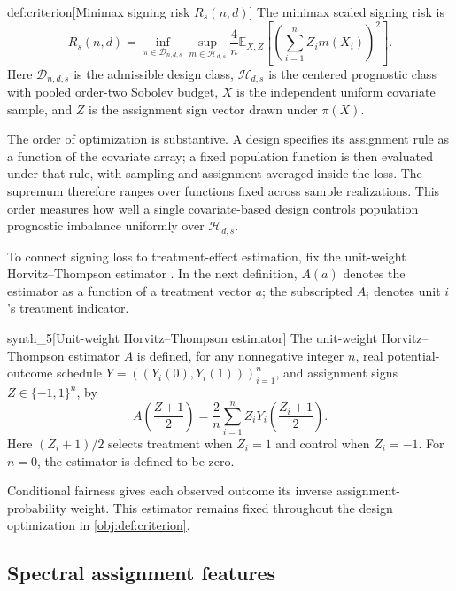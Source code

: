 \documentclass[11pt]{article}
\begin{document}
\begin{definitionv}{def:criterion}[Minimax signing risk $R_s(n,d)$]
The minimax scaled signing risk is
\[
R_s(n,d)
=
\inf_{\pi\in\mathcal D_{n,d,s}}
\sup_{m\in\mathcal H_{d,s}}
\frac{4}{n}
\mathbb E_{X,Z}
\left[
\left(\sum_{i=1}^{n}Z_i m(X_i)\right)^2
\right].
\]
Here \(\mathcal D_{n,d,s}\) is the admissible design class, \(\mathcal H_{d,s}\) is the centered prognostic class with pooled order-two Sobolev budget, \(X\) is the independent uniform covariate sample, and \(Z\) is the assignment sign vector drawn under \(\pi(X)\).
\end{definitionv}

The order of optimization is substantive. A design specifies its assignment rule as a function of the covariate array; a fixed population function is then evaluated under that rule, with sampling and assignment averaged inside the loss. The supremum therefore ranges over functions fixed across sample realizations. This order measures how well a single covariate-based design controls population prognostic imbalance uniformly over \(\mathcal H_{d,s}\).

To connect signing loss to treatment-effect estimation, fix the unit-weight Horvitz--Thompson estimator \citep{Horvitz1952}. In the next definition, \(A(a)\) denotes the estimator as a function of a treatment vector \(a\); the subscripted \(A_i\) denotes unit \(i\)'s treatment indicator.

\begin{definitionv}{synth_5}[Unit-weight Horvitz--Thompson estimator]
The unit-weight Horvitz--Thompson estimator \(A\) is defined, for any nonnegative integer \(n\), real potential-outcome schedule \(Y=((Y_i(0),Y_i(1)))_{i=1}^n\), and assignment signs \(Z\in\{-1,1\}^n\), by
\[
A\!\left(\frac{Z+1}{2}\right)
=
\frac{2}{n}\sum_{i=1}^n Z_i
Y_i\!\left(\frac{Z_i+1}{2}\right).
\]
Here \((Z_i+1)/2\) selects treatment when \(Z_i=1\) and control when \(Z_i=-1\). For \(n=0\), the estimator is defined to be zero.
\end{definitionv}

Conditional fairness gives each observed outcome its inverse assignment-probability weight. This estimator remains fixed throughout the design optimization in \cref{obj:def:criterion}.

\subsection{Spectral assignment features}
\end{document}
